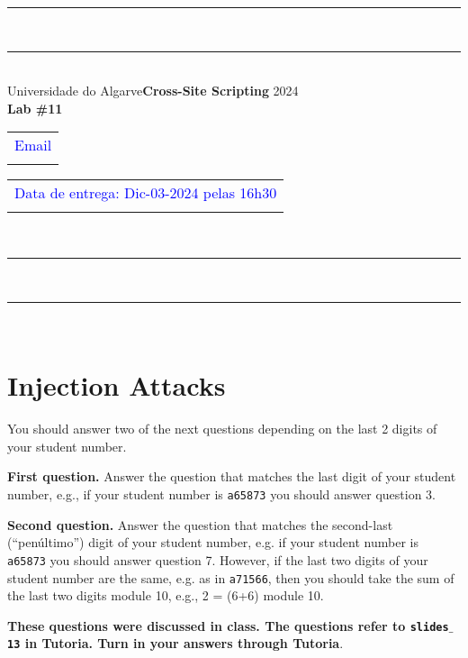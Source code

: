 \documentclass{article}
\begin{document}
\begin{center}
\rule{\textwidth}{.0075in} \\
\rule[3mm]{\textwidth}{.0075in}\\

Universidade do Algarve\hfill \textbf{Cross-Site Scripting} \hfill 2024\\[3ex]

{\Large\bf Lab \#11} \\[3ex]

\begin{tabular}{l}
\textcolor{blue}{Email} \\ \hfill 
\end{tabular}
\begin{tabular}{l}
\textcolor{blue}{Data de entrega: Dic-03-2024 pelas 16h30} \\ \hfill 
\end{tabular}\\

\rule{\textwidth}{.0075in} \\
\rule[3mm]{\textwidth}{.0075in} \\
\end{center}

\section*{Injection Attacks}
You should answer two of the next questions depending on the last 2 digits of your student
number.

\bigskip

\noindent
\textbf{First question.} Answer the question that matches the last
digit of your student number, e.g., if your student number is
\texttt{a65873} you should answer question 3.

\bigskip

\noindent
\textbf{Second question.} Answer the question that matches the
second-last (``penúltimo'') digit of your student number, e.g. if your
student number is \texttt{a65873} you should answer question
7. However, if the last two digits of your student number are the
same, e.g. as in \texttt{a71566}, then you should take the sum of the last
two digits module 10, e.g., 2 = (6+6) module 10.

\bigskip

{\large
  \noindent \textbf{These questions were discussed in class. The questions
    refer to \texttt{slides$\_$13} in Tutoria. Turn in your answers
    through Tutoria}.  }
\end{document}
